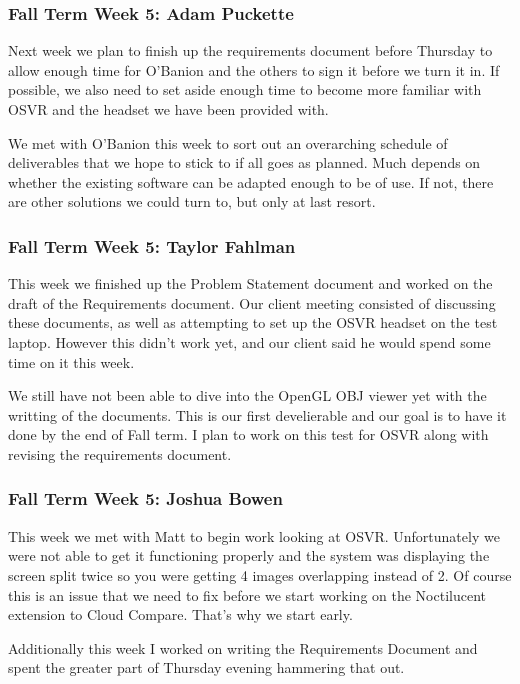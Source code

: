 \documentclass[draftclsnofoot,onecolumn]{IEEEtran}
\begin{document}
\subsubsection{Fall Term Week 5: Adam Puckette}

Next week we plan to finish up the requirements document before Thursday to allow enough time for O'Banion and the others to sign it before we turn it in. If possible, we also need to set aside enough time to become more familiar with OSVR and the headset we have been provided with.

We met with O'Banion this week to sort out an overarching schedule of deliverables that we hope to stick to if all goes as planned. Much depends on whether the existing software can be adapted enough to be of use. If not, there are other solutions we could turn to, but only at last resort.

\subsubsection{Fall Term Week 5: Taylor Fahlman}

This week we finished up the Problem Statement document and worked on the draft of the Requirements document. Our client meeting consisted of discussing these documents, as well as attempting to set up the OSVR headset on the test laptop. However this didn't work yet, and our client said he would spend some time on it this week.

We still have not been able to dive into the OpenGL OBJ viewer yet with the writting of the documents. This is our first develierable and our goal is to have it done by the end of Fall term. I plan to work on this test for OSVR along with revising the requirements document.

\subsubsection{Fall Term Week 5: Joshua Bowen}

This week we met with Matt to begin work looking at OSVR. Unfortunately we were not able to get it functioning properly and the system was displaying the screen split twice so you were getting 4 images overlapping instead of 2. Of course this is an issue that we need to fix before we start working on the Noctilucent extension to Cloud Compare. That's why we start early.

Additionally this week I worked on writing the Requirements Document and spent the greater part of Thursday evening hammering that out.
\end{document}

